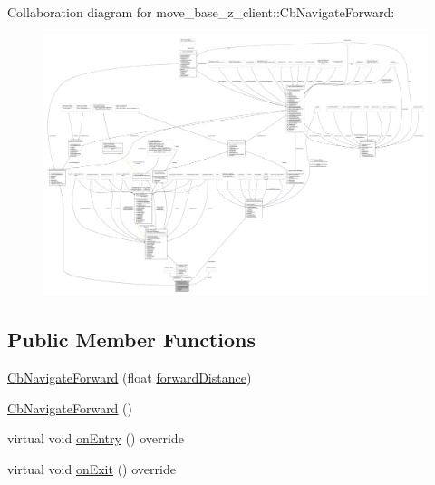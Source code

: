 Collaboration diagram for move\+\_\+base\+\_\+z\+\_\+client\+:\+:Cb\+Navigate\+Forward\+:
\nopagebreak
\begin{figure}[H]
\begin{center}
\leavevmode
\includegraphics[width=350pt]{classmove__base__z__client_1_1CbNavigateForward__coll__graph}
\end{center}
\end{figure}
\subsection*{Public Member Functions}
\begin{DoxyCompactItemize}
\item 
\hyperlink{classmove__base__z__client_1_1CbNavigateForward_a14f25162a57acb3d0a0e693ec77b08b7}{Cb\+Navigate\+Forward} (float \hyperlink{classmove__base__z__client_1_1CbNavigateForward_ab3097d686b5a82b4f650bc5175d8ab73}{forward\+Distance})
\item 
\hyperlink{classmove__base__z__client_1_1CbNavigateForward_a9acd20b586f4b5892af7e01d8ddf309c}{Cb\+Navigate\+Forward} ()
\item 
virtual void \hyperlink{classmove__base__z__client_1_1CbNavigateForward_ab167238d60578809027d4649a4eea536}{on\+Entry} () override
\item 
virtual void \hyperlink{classmove__base__z__client_1_1CbNavigateForward_aad7d35b5c46b938cfa64a6f14ecf2337}{on\+Exit} () override
\end{DoxyCompactItemize}
